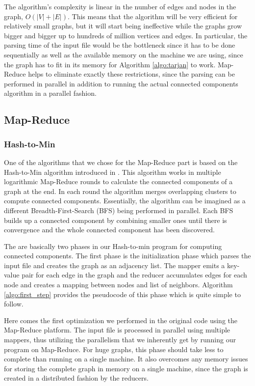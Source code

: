 The algorithm's complexity is linear in the number of edges and nodes in the graph, \ie $O(|V| + |E|)$. This means that the algorithm will be very efficient for relatively small graphs, but it will start being ineffective while the graphs grow bigger and bigger up to hundreds of million vertices and edges. In particular, the parsing time of the input file would be the bottleneck since it has to be done sequentially as well as the available memory on the machine we are using, since the graph has to fit in its memory for Algorithm \ref{algo:tarjan} to work. Map-Reduce helps to eliminate exactly these restrictions, since the parsing can be performed in parallel in addition to running the actual connected components algorithm in a parallel fashion.

\subsection{Map-Reduce}

\subsubsection{Hash-to-Min}


One of the algorithms that we chose for the Map-Reduce part is based on the Hash-to-Min algorithm introduced in \cite{rastogi}. This algorithm works in multiple logarithmic Map-Reduce rounds  to calculate the connected components of a graph at the end. In each round the algorithm merges overlapping clusters to compute connected components. Essentially, the algorithm can be imagined as a different Breadth-First-Search (\eg BFS) being performed in parallel. Each BFS builds up a connected component by combining smaller ones until there is convergence and the whole connected component has been discovered.

The are basically two phases in our Hash-to-min program for computing connected components. The first phase is the initialization phase which parses the input file and creates the graph as an adjacency list. The mapper emits a key-value pair for each edge in the graph and the reducer accumulates edges for each node and creates a mapping between nodes and list of neighbors. Algorithm \ref{algo:first_step} provides the pseudocode of this phase which is quite simple to follow.

Here comes the first optimization we performed in the original code using the Map-Reduce platform. The input file is processed in parallel using multiple mappers, thus utilizing the parallelism that we inherently get by running our program on Map-Reduce. For huge graphs, this phase should take less to complete than running on a single machine. It also overcomes any memory issues for storing the complete graph in memory on a single machine, since the graph is created in a distributed fashion by the reducers.

